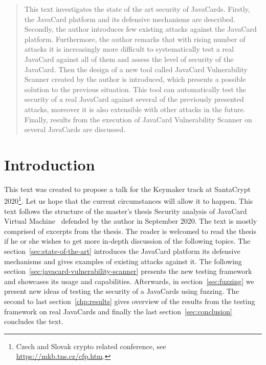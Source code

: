 \documentclass{../llncs/llncs}
\begin{document}
\maketitle

\begin{abstract}
This text investigates the state of the art security of JavaCards. Firstly, the JavaCard platform and its defensive mechanisms are described. Secondly, the author introduces few existing attacks against the JavaCard platform. Furthermore, the author remarks that with rising number of attacks it is increasingly more difficult to systematically test a real JavaCard against all of them and assess the level of security of the JavaCard. Then the design of a new tool called JavaCard Vulnerability Scanner created by the author is introduced, which presents a possible solution to the previous situation. This tool can automatically test the security of a real JavaCard against several of the previously presented attacks, moreover it is also extensible with other attacks in the future. Finally, results from the execution of JavaCard Vulnerability Scanner on several JavaCards are discussed.
\end{abstract}



\section{Introduction}

This text was created to propose a talk for the Keymaker track at SantaCrypt 2020\footnote{Czech and Slovak crypto related conference, see \url{https://mkb.tns.cz/cfp.htm}.}. Let us hope that the current circumstances will allow it to happen. This text follows the structure of the master's thesis Security analysis of JavaCard Virtual Machine~\cite{Kvapil2020thesis} defended by the author in September 2020. The text is mostly comprised of excerpts from the thesis. The reader is welcomed to read the thesis if he or she wishes to get more in-depth discussion of the following topics.
The section~\ref{sec:state-of-the-art} introduces the JavaCard platform its defensive mechanisms and gives examples of existing attacks against it. The following section~\ref{sec:javacard-vulnerability-scanner} presents the new testing framework \projectname and showcases its usage and capabilities. Afterwards, in section~\ref{sec:fuzzing} we present new ideas of testing the security of a JavaCards using fuzzing. The second to last section~\ref{chp:results} gives overview of the results from the testing framework on real JavaCards and finally the last section~\ref{sec:conclusion} concludes the text.
\end{document}
